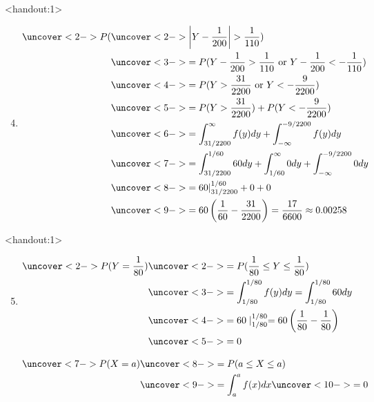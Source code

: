 \documentclass[handout]{beamer}\usepackage{graphicx, color}
\newcommand{\answers}{1}
\numberwithin{equation}{section}
\begin{document}
\begin{frame}<handout:\answers>
\begin{enumerate}[1. ]
\setcounter{enumi}{3}
\item 
\begin{align*}
\uncover<2->{ P(} &\uncover<2->{  \left |Y - \frac{1}{200} \right | > \frac{1}{110})} \\
&\uncover<3->{ = P(Y - \frac{1}{200} > \frac{1}{110} \text{ or } Y - \frac{1}{200} < -\frac{1}{110})} \\
&\uncover<4->{ = P(Y > \frac{31}{2200} \text{ or } Y < -\frac{9}{2200}) }\\
&\uncover<5->{ = P(Y > \frac{31}{2200}) + P(Y < -\frac{9}{2200})} \\
&\uncover<6->{ = \int_{31/2200}^\infty f(y) dy + \int_{-\infty}^{-9/2200} f(y)dy} \\
&\uncover<7->{ = \int_{31/2200}^{1/60} 60 dy + \int_{1/60}^\infty 0 dy + \int_{-\infty}^{-9/2200} 0 dy} \\
&\uncover<8->{ = 60 |_{31/2200}^{1/60} + 0 + 0} \\
&\uncover<9->{  = 60 \left (\frac{1}{60} - \frac{31}{2200} \right  ) = \frac{17}{6600} \approx 0.00258}
\end{align*}
\end{enumerate}
\end{frame}

\begin{frame}<handout:\answers>

\begin{enumerate}[1. ]
\setcounter{enumi}{4}
\item 

\begin{align*}
\uncover<2->{ P(Y = \frac{1}{80})} &\uncover<2->{ = P(\frac{1}{80} \le Y \le \frac{1}{80})} \\
&\uncover<3->{ = \int_{1/80}^{1/80} f(y) dy = \int_{1/80}^{1/80} 60 dy} \\
&\uncover<4->{ = 60 \mid_{1/80}^{1/80} = 60 \left ( \frac{1}{80} - \frac{1}{80} \right )} \\
&\uncover<5->{  = 0}
\end{align*}

\begin{align*}
\uncover<7->{ P(X = a)} &\uncover<8->{ = P(a \le X \le a)} \\
&\uncover<9->{ = \int_a^a f(x) dx} \uncover<10->{  = 0}
\end{align*}
\end{enumerate}
\end{frame}
\end{document}
